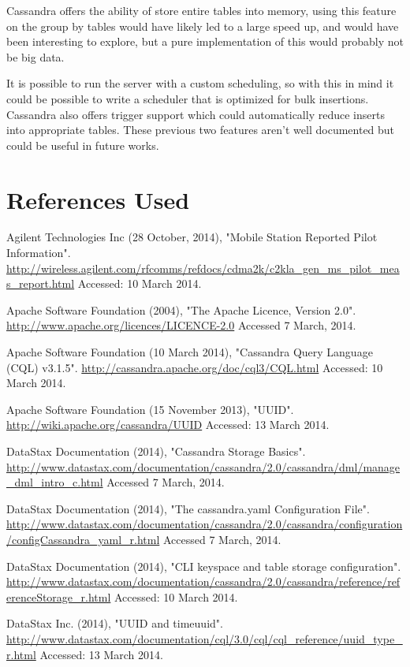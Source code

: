 \documentclass[letterpaper]{article}
\begin{document}
Cassandra offers the ability of store entire tables into memory, using this feature on the
group by tables would have likely led to a large speed up, and would have been
interesting to explore, but a pure implementation of this would probably not be big data.

It is possible to run the server with a custom scheduling, so with this in mind it could be possible
to write a scheduler that is optimized for bulk insertions.
Cassandra also offers trigger support which could automatically reduce inserts into
appropriate tables. These previous two features aren't well documented but could be useful in future
works.

\section{References Used}

Agilent Technologies Inc (28 October, 2014), "Mobile Station Reported Pilot Information".
\url{http://wireless.agilent.com/rfcomms/refdocs/cdma2k/c2kla_gen_ms_pilot_meas_report.html}
Accessed: 10 March 2014.

Apache Software Foundation (2004), "The Apache Licence, Version 2.0".
\url{http://www.apache.org/licences/LICENCE-2.0}
Accessed 7 March, 2014.

Apache Software Foundation (10 March 2014), "Cassandra Query Language (CQL) v3.1.5".
\url{http://cassandra.apache.org/doc/cql3/CQL.html}
Accessed: 10 March 2014.

Apache Software Foundation (15 November 2013), "UUID".
\url{http://wiki.apache.org/cassandra/UUID}
Accessed: 13 March 2014.

DataStax Documentation (2014), "Cassandra Storage Basics".
\url{http://www.datastax.com/documentation/cassandra/2.0/cassandra/dml/manage_dml_intro_c.html}
Accessed 7 March, 2014.

DataStax Documentation (2014), "The cassandra.yaml Configuration File".
\url{http://www.datastax.com/documentation/cassandra/2.0/cassandra/configuration/configCassandra_yaml_r.html}
Accessed 7 March, 2014.  

DataStax Documentation (2014), "CLI keyspace and table storage configuration".
\url{http://www.datastax.com/documentation/cassandra/2.0/cassandra/reference/referenceStorage_r.html}
Accessed: 10 March 2014.

DataStax Inc. (2014), "UUID and timeuuid".
\url{http://www.datastax.com/documentation/cql/3.0/cql/cql_reference/uuid_type_r.html}
Accessed: 13 March 2014.
\end{document}
